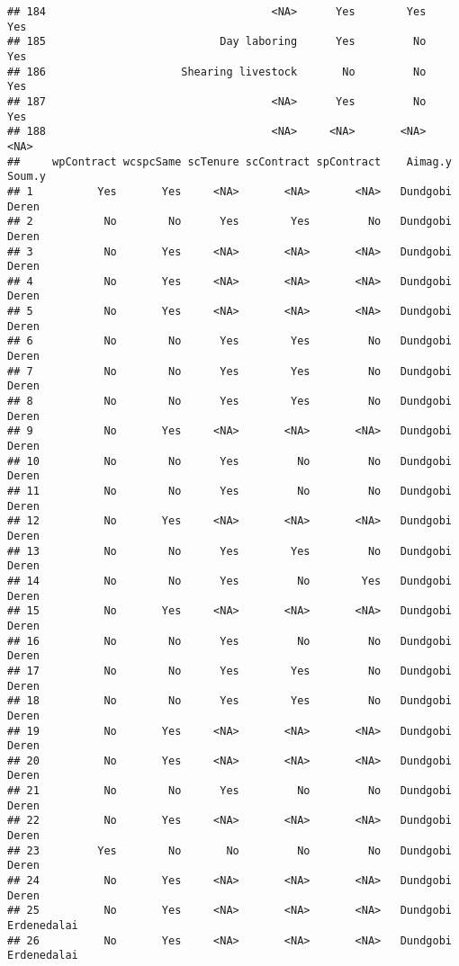 \documentclass[
]{article}
\begin{document}
\begin{verbatim}
## 184                                   <NA>      Yes        Yes      Yes
## 185                           Day laboring      Yes         No      Yes
## 186                     Shearing livestock       No         No      Yes
## 187                                   <NA>      Yes         No      Yes
## 188                                   <NA>     <NA>       <NA>     <NA>
##     wpContract wcspcSame scTenure scContract spContract    Aimag.y       Soum.y
## 1          Yes       Yes     <NA>       <NA>       <NA>   Dundgobi        Deren
## 2           No        No      Yes        Yes         No   Dundgobi        Deren
## 3           No       Yes     <NA>       <NA>       <NA>   Dundgobi        Deren
## 4           No       Yes     <NA>       <NA>       <NA>   Dundgobi        Deren
## 5           No       Yes     <NA>       <NA>       <NA>   Dundgobi        Deren
## 6           No        No      Yes        Yes         No   Dundgobi        Deren
## 7           No        No      Yes        Yes         No   Dundgobi        Deren
## 8           No        No      Yes        Yes         No   Dundgobi        Deren
## 9           No       Yes     <NA>       <NA>       <NA>   Dundgobi        Deren
## 10          No        No      Yes         No         No   Dundgobi        Deren
## 11          No        No      Yes         No         No   Dundgobi        Deren
## 12          No       Yes     <NA>       <NA>       <NA>   Dundgobi        Deren
## 13          No        No      Yes        Yes         No   Dundgobi        Deren
## 14          No        No      Yes         No        Yes   Dundgobi        Deren
## 15          No       Yes     <NA>       <NA>       <NA>   Dundgobi        Deren
## 16          No        No      Yes         No         No   Dundgobi        Deren
## 17          No        No      Yes        Yes         No   Dundgobi        Deren
## 18          No        No      Yes        Yes         No   Dundgobi        Deren
## 19          No       Yes     <NA>       <NA>       <NA>   Dundgobi        Deren
## 20          No       Yes     <NA>       <NA>       <NA>   Dundgobi        Deren
## 21          No        No      Yes         No         No   Dundgobi        Deren
## 22          No       Yes     <NA>       <NA>       <NA>   Dundgobi        Deren
## 23         Yes        No       No         No         No   Dundgobi        Deren
## 24          No       Yes     <NA>       <NA>       <NA>   Dundgobi        Deren
## 25          No       Yes     <NA>       <NA>       <NA>   Dundgobi  Erdenedalai
## 26          No       Yes     <NA>       <NA>       <NA>   Dundgobi  Erdenedalai

\end{verbatim}
\end{document}
